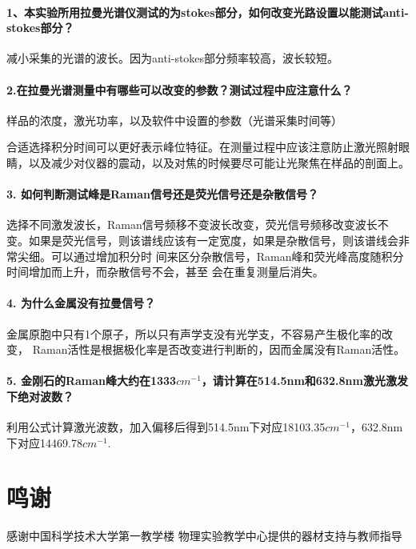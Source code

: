 \documentclass[hyperref]{ctexart}
\begin{document}
\begin{multicols}{2}
		\paragraph{1、本实验所用拉曼光谱仪测试的为stokes部分，如何改变光路设置以能测试anti-stokes部分？}
		
		减小采集的光谱的波长。因为anti-stokes部分频率较高，波长较短。
		
		
		\paragraph{2.在拉曼光谱测量中有哪些可以改变的参数？测试过程中应注意什么？}
		
		样品的浓度，激光功率，以及软件中设置的参数（光谱采集时间等）
		
		
		合适选择积分时间可以更好表示峰位特征。在测量过程中应该注意防止激光照射眼睛，以及减少对仪器的震动，以及对焦的时候要尽可能让光聚焦在样品的剖面上。
		
		
		\paragraph{3. 如何判断测试峰是Raman信号还是荧光信号还是杂散信号？}
		
		选择不同激发波长，Raman信号频移不变波长改变，荧光信号频移改变波长不变。如果是荧光信号，则该谱线应该有一定宽度，如果是杂散信号，则该谱线会非常尖细。可以通过增加积分时
		间来区分杂散信号，Raman峰和荧光峰⾼度随积分时间增加⽽上升，⽽杂散信号不会，甚⾄
		会在重复测量后消失。
		
		\paragraph{4. 为什么金属没有拉曼信号？}
		
		金属原胞中只有1个原子，所以只有声学支没有光学支，不容易产生极化率的改变，
		Raman活性是根据极化率是否改变进行判断的，因而金属没有Raman活性。
		
		\paragraph{5. 金刚石的Raman峰大约在1333$cm^{-1}$，请计算在514.5nm和632.8nm激光激发下绝对波数？}
		
		利用公式计算激光波数，加入偏移后得到514.5nm下对应18103.35$cm^{-1}$，632.8nm下对应14469.78$cm^{-1}$.
		
		
		\section*{鸣谢}
		感谢中国科学技术大学第一教学楼 物理实验教学中心提供的器材支持与教师指导
		

\end{multicols}
\end{document}

